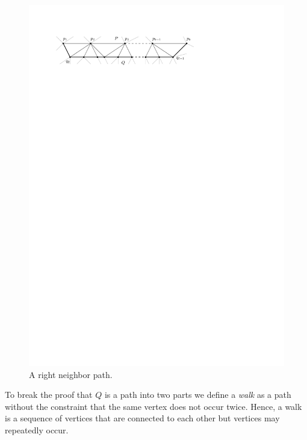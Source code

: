    \begin{figure}[t]
      \centering
      \includegraphics[scale=1]{unifiedAlgo/img/rightNeighbourwalk/neighborPath.pdf}
      \caption{A right neighbor path.}
      \label{fig:right:neighborPath}
    \end{figure}

    To break the proof that $Q$ is a path into two parts we define a \emph{walk} as a path without the constraint that the same vertex does not occur twice. Hence, a walk is a sequence of vertices that are connected to each other but vertices may repeatedly occur.

